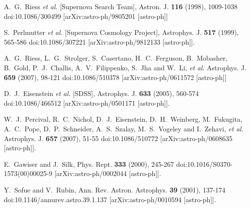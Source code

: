 \documentclass[a4paper,12pt]{article}
\begin{document}
\begin{thebibliography}{99}

		
A.~G.~Riess \textit{et al.} [Supernova Search Team],
Astron. J. \textbf{116} (1998), 1009-1038
doi:10.1086/300499
[arXiv:astro-ph/9805201 [astro-ph]]
		
		
S.~Perlmutter \textit{et al.} [Supernova Cosmology Project],
Astrophys. J. \textbf{517} (1999), 565-586
doi:10.1086/307221
[arXiv:astro-ph/9812133 [astro-ph]].
		
A.~G.~Riess, L.~G.~Strolger, S.~Casertano, H.~C.~Ferguson, B.~Mobasher, B.~Gold, P.~J.~Challis, A.~V.~Filippenko, S.~Jha and W.~Li, \textit{et al.}
Astrophys. J. \textbf{659} (2007), 98-121
doi:10.1086/510378 [arXiv:astro-ph/0611572 [astro-ph]]
		
		
D.~J.~Eisenstein \textit{et al.} [SDSS],
Astrophys. J. \textbf{633} (2005), 560-574
doi:10.1086/466512
[arXiv:astro-ph/0501171 [astro-ph]].
		
W.~J.~Percival, R.~C.~Nichol, D.~J.~Eisenstein, D.~H.~Weinberg, M.~Fukugita, A.~C.~Pope, D.~P.~Schneider, A.~S.~Szalay, M.~S.~Vogeley and I.~Zehavi, \textit{et al.}
Astrophys. J. \textbf{657} (2007), 51-55 doi:10.1086/510772
[arXiv:astro-ph/0608635 [astro-ph]].
		

E.~Gawiser and J.~Silk,
Phys. Rept. \textbf{333} (2000), 245-267
doi:10.1016/S0370-1573(00)00025-9
[arXiv:astro-ph/0002044 [astro-ph]].
		
		
		
		
Y.~Sofue and V.~Rubin,
Ann. Rev. Astron. Astrophys. \textbf{39} (2001), 137-174
doi:10.1146/annurev.astro.39.1.137
[arXiv:astro-ph/0010594 [astro-ph]].
		

\end{thebibliography}
\end{document}
